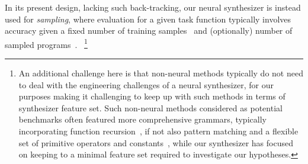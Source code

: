 \documentclass{article}
\begin{document}
In its present design, lacking such back-tracking,
our neural synthesizer is instead used for \emph{sampling},
where evaluation for a given task function typically involves accuracy given a fixed number of training samples~\citep{npi} and (optionally) number of sampled programs~\citep{nsps}.%
~\footnote{
    An additional challenge here is that non-neural methods typically do not need to deal with the engineering challenges of a neural synthesizer,
    for our purposes making it challenging to keep up with such methods in terms of synthesizer feature set.
    Such non-neural methods considered as potential benchmarks often featured more comprehensive grammars,
    typically incorporating function recursion~\citep{typedmil,myth},
    if not also pattern matching and a flexible set of primitive operators and constants~\citep{lambda2},
    while our synthesizer has focused on keeping to a minimal feature set required to investigate our hypotheses.
}

\end{document}
